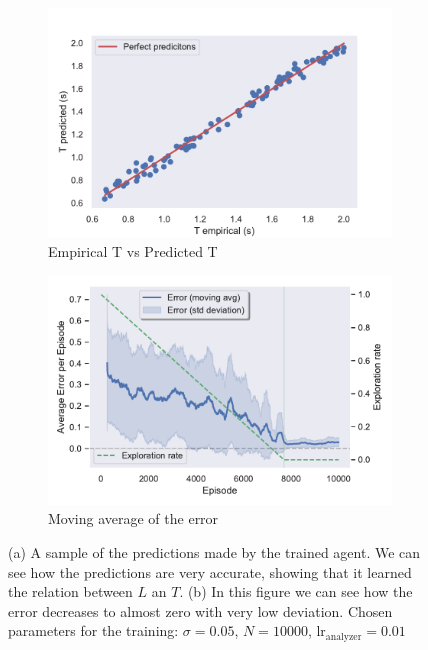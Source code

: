 \documentclass[11pt,a4paper,twoside]{report}
\newcommand{\+}{\textnormal{+} }
\theoremstyle{definition}
\numberwithin{equation}{chapter}
\begin{document}
  
\begin{figure}[t]
  \centering
  \begin{subfigure}{.5\textwidth}
    \centering
    \includegraphics[width=1\linewidth]{figures/Real-vs-Pred-Pendulum.pdf}
    \caption{Empirical T vs Predicted T}
    \label{fig:RealvsPredictedPendulum}
  \end{subfigure}%
  \begin{subfigure}{.5\textwidth}
    \centering
    \includegraphics[width=1\linewidth]{figures/Error-Pendulum.pdf}
    \caption{Moving average of the error}
    \label{fig:ErrorAveragePendulum}
  \end{subfigure}
  \caption{(a) A sample of the predictions made by the trained agent. We can see
  how the predictions are very accurate, showing that it learned the relation
  between $L$ an $T$. (b) In this figure we can see how the error decreases to
  almost zero with very low deviation. Chosen parameters for the training:
  $\sigma=0.05$, $N=10000$, $\text{lr}_\text{analyzer}=0.01$}
  \label{fig:PendulumError}
  \end{figure}
\end{document}

